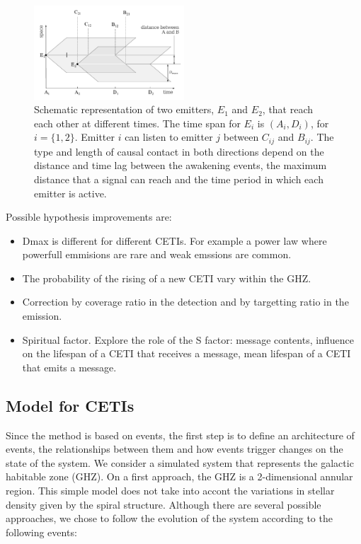\documentclass[useAMS,usenatbib]{mnras}
\begin{document}
  
\begin{figure}
   \centering
   \includegraphics[width=0.5\textwidth]{abcd.pdf}
   \caption{Schematic representation of two emitters, $E_1$ and $E_2$,
   that reach each other at different times.  The time span for $E_i$
   is $(A_i, D_i)$, for $i=\{1,2\}$.  Emitter $i$ can listen to
   emitter $j$ between $C_{ij}$ and $B_{ij}$.
   The type and length of causal contact in both directions depend on
   the distance and time lag between the awakening events, the maximum
   distance that a signal can reach and the time period in which each
   emitter is active.}
   \label{F_abcd}
\end{figure}
                     

Possible hypothesis improvements are:

\begin{itemize}
   \item Dmax is different for different CETIs.  For example a power
      law where powerfull emmisions are rare and weak emssions are
      common.
   \item The probability of the rising of a new CETI vary within the
      GHZ.
   \item Correction by coverage ratio in the detection and by
      targetting ratio in the emission.
   \item Spiritual factor.  Explore the role of the S factor: message
      contents, influence on the lifespan of a CETI that receives a
      message, mean lifespan of a CETI that emits a message.
\end{itemize}


\subsection{Model for CETIs}


Since the method is based on events, the first step is to define an
architecture of events, the relationships between them and how events
trigger changes on the state of the system.
%
We consider a simulated system that represents the galactic habitable
zone (GHZ).
%
On a first approach, the GHZ is a 2-dimensional annular region.
%
This simple model does not take into accont the variations in stellar
density given by the spiral structure.
%
Although there are several possible approaches, we chose to follow the
evolution of the system according to the following events:
\end{document}
